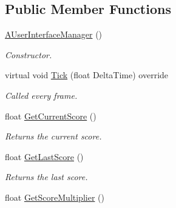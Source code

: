 \subsection*{Public Member Functions}
\begin{DoxyCompactItemize}
\item 
\mbox{\label{class_a_user_interface_manager_a87749ed98cd7568c5de320bd6a9282ec}} 
\mbox{\hyperlink{class_a_user_interface_manager_a87749ed98cd7568c5de320bd6a9282ec}{A\+User\+Interface\+Manager}} ()
\begin{DoxyCompactList}\small\item\em Constructor. \end{DoxyCompactList}\item 
\mbox{\label{class_a_user_interface_manager_a37044120f159092a04b598a4f4b83643}} 
virtual void \mbox{\hyperlink{class_a_user_interface_manager_a37044120f159092a04b598a4f4b83643}{Tick}} (float Delta\+Time) override
\begin{DoxyCompactList}\small\item\em Called every frame. \end{DoxyCompactList}\item 
\mbox{\label{class_a_user_interface_manager_a1fd0354c446579ba0a7fdc7cc0fd520f}} 
float \mbox{\hyperlink{class_a_user_interface_manager_a1fd0354c446579ba0a7fdc7cc0fd520f}{Get\+Current\+Score}} ()
\begin{DoxyCompactList}\small\item\em Returns the current score. \end{DoxyCompactList}\item 
\mbox{\label{class_a_user_interface_manager_a172fb08ed68ad0d6c60d9ebcac38e6de}} 
float \mbox{\hyperlink{class_a_user_interface_manager_a172fb08ed68ad0d6c60d9ebcac38e6de}{Get\+Last\+Score}} ()
\begin{DoxyCompactList}\small\item\em Returns the last score. \end{DoxyCompactList}\item 
\mbox{\label{class_a_user_interface_manager_ae8fbb5d467e403f4f8e6a871c77a2a97}} 
float \mbox{\hyperlink{class_a_user_interface_manager_ae8fbb5d467e403f4f8e6a871c77a2a97}{Get\+Score\+Multiplier}} ()

\end{DoxyCompactItemize}
